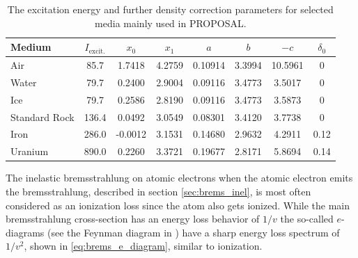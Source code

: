 \begin{table}
    \caption{The excitation energy and further density correction parameters for selected media mainly used in PROPOSAL. \cite{Groom01}}
    \label{tab:ioniz_const}
    \begin{center}
    \begin{tabular}{l | S[table-format=3.1] S[table-format=+1.4] S[table-format=1.4] S[table-format=1.5] S[table-format=1.4] S[table-format=2.4] S[table-format=1.2]}
        \toprule
        Medium & {$I_{\text{excit.}}$} & {$x_0$} & {$x_1$} & {$a$} & {$b$} & {$-c$} & {$\delta_0$} \\
        \midrule
        Air           & 85.7  & 1.7418 & 4.2759 & 0.10914 & 3.3994 & 10.5961 & 0 \\
        Water         & 79.7  & 0.2400 & 2.9004 & 0.09116 & 3.4773 & 3.5017 & 0 \\
        Ice           & 79.7  & 0.2586 & 2.8190 & 0.09116 & 3.4773 & 3.5873 & 0 \\
        Standard Rock & 136.4 & 0.0492 & 3.0549 & 0.08301 & 3.4120 & 3.7738 & 0 \\
        Iron          & 286.0 & -0.0012 & 3.1531 & 0.14680 & 2.9632 & 4.2911 & 0.12 \\
        Uranium       & 890.0 & 0.2260 & 3.3721 & 0.19677 & 2.8171 & 5.8694 & 0.14 \\
        \bottomrule
    \end{tabular}
    \end{center}
\end{table}

The inelastic bremsstrahlung on atomic electrons when the atomic electron emits the bremsstrahlung, described in section \ref{sec:brems_inel}, is most often considered as an ionization loss since the atom also gets ionized.
While the main bremsstrahlung cross-section has an energy loss behavior of $1/v$ the so-called $e$-diagrams (see the Feynman diagram in ) have a sharp energy loss spectrum of $1/v^2$, shown in \eqref{eq:brems_e_diagram}, similar to ionization.

